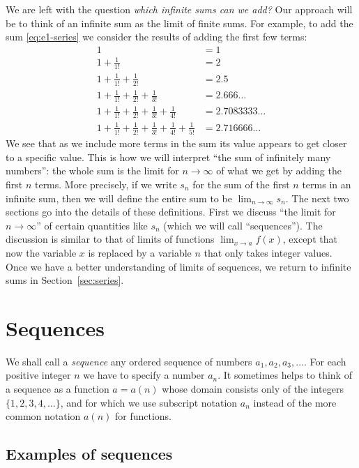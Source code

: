 We are left with the question \textit{which infinite sums can we add?}  Our
approach will be to think of an infinite sum as the limit of finite sums.  For
example, to add the sum \eqref{eq:e1-series} we consider the results of adding
the first few terms:
\begin{align*}
  1&=1\\
  1+\frac{1}{1!}&=2\\
  1+\frac{1}{1!}+\frac{1}{2!}&=2.5\\
  1+\frac{1}{1!}+\frac{1}{2!}+\frac{1}{3!}&=2.666\ldots\\
  1+\frac{1}{1!}+\frac{1}{2!}+\frac{1}{3!}+\frac{1}{4!}&=2.7083333\ldots\\
  1+\frac{1}{1!}+\frac{1}{2!}+\frac{1}{3!}+\frac{1}{4!}+\frac{1}{5!}&=2.716666\ldots
\end{align*}
We see that as we include more terms in the sum its value appears to get closer
to a specific value.  This is how we will interpret ``the sum of infinitely many
numbers'': the whole sum is the limit for $n\to\infty$ of what we get by adding
the first $n$ terms.
More precisely, if we write $s_n$ for the sum of the first $n$ terms in an
infinite sum, then we will define the entire sum to be $\lim_{n\to\infty} s_n$.  
The next two sections go into the details of these definitions.
First we discuss ``the limit for $n\to\infty$'' of
certain quantities like $s_n$ (which we will call ``sequences'').  The
discussion is similar to that of limits of functions $\lim_{x\to a}f(x)$, except
that now the variable $x$ is replaced by a variable $n$ that only takes integer
values.  Once we have a better understanding of limits of sequences, we return
to infinite sums in Section~\ref{sec:series}.

\section{Sequences} %
\label{sec:limit-ntoi-keeping}
\label{sec:sequ-their-limits}

We shall call a \emph{sequence} any ordered sequence of numbers $a_1, a_2,
a_3, \ldots$.  For each positive integer $n$ we have to specify a number
$a_n$.  It sometimes helps to think of a sequence as a function $a = a(n)$ whose
domain consists only of the integers $\{1, 2, 3, 4, \ldots\}$, and for which we
use subscript notation $a_n$ instead of the more common notation $a(n)$ for functions.

\subsection{Examples of sequences} %
~\null


